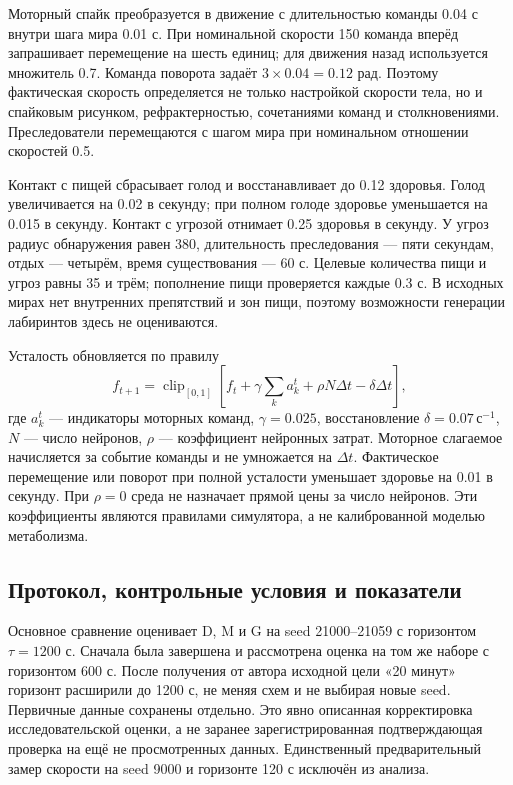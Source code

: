 \documentclass[11pt]{article}
\begin{document}
Моторный спайк преобразуется в движение с длительностью команды 0.04 с внутри шага мира 0.01 с. При номинальной скорости 150 команда вперёд запрашивает перемещение на шесть единиц; для движения назад используется множитель 0.7. Команда поворота задаёт $3\times0.04=0.12$ рад. Поэтому фактическая скорость определяется не только настройкой скорости тела, но и спайковым рисунком, рефрактерностью, сочетаниями команд и столкновениями. Преследователи перемещаются с шагом мира при номинальном отношении скоростей 0.5.

Контакт с пищей сбрасывает голод и восстанавливает до 0.12 здоровья. Голод увеличивается на 0.02 в секунду; при полном голоде здоровье уменьшается на 0.015 в секунду. Контакт с угрозой отнимает 0.25 здоровья в секунду. У угроз радиус обнаружения равен 380, длительность преследования --- пяти секундам, отдых --- четырём, время существования --- 60 с. Целевые количества пищи и угроз равны 35 и трём; пополнение пищи проверяется каждые 0.3 с. В исходных мирах нет внутренних препятствий и зон пищи, поэтому возможности генерации лабиринтов здесь не оцениваются.

Усталость обновляется по правилу
\begin{equation}
 f_{t+1}=\operatorname{clip}_{[0,1]}\left[f_t+\gamma\sum_k a_k^t+\rho N\Delta t-\delta\Delta t\right],
\end{equation}
где $a_k^t$ --- индикаторы моторных команд, $\gamma=0.025$, восстановление $\delta=0.07\,\mathrm{с}^{-1}$, $N$ --- число нейронов, $\rho$ --- коэффициент нейронных затрат. Моторное слагаемое начисляется за событие команды и не умножается на $\Delta t$. Фактическое перемещение или поворот при полной усталости уменьшает здоровье на 0.01 в секунду. При $\rho=0$ среда не назначает прямой цены за число нейронов. Эти коэффициенты являются правилами симулятора, а не калиброванной моделью метаболизма.

\subsection{Протокол, контрольные условия и показатели}
Основное сравнение оценивает D, M и G на seed 21000--21059 с горизонтом $\tau=1200$ с. Сначала была завершена и рассмотрена оценка на том же наборе с горизонтом 600 с. После получения от автора исходной цели «20 минут» горизонт расширили до 1200 с, не меняя схем и не выбирая новые seed. Первичные данные сохранены отдельно. Это явно описанная корректировка исследовательской оценки, а не заранее зарегистрированная подтверждающая проверка на ещё не просмотренных данных. Единственный предварительный замер скорости на seed 9000 и горизонте 120 с исключён из анализа.
\end{document}
